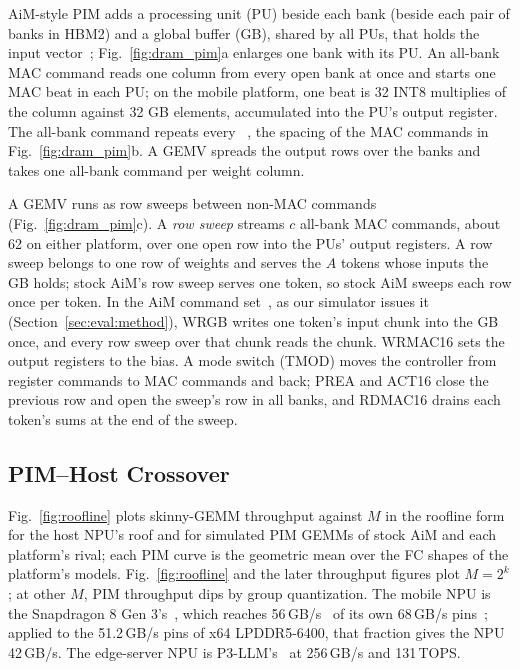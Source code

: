 AiM-style PIM adds a processing unit (PU) beside each bank (beside each pair of banks in HBM2) and a global buffer (GB),
shared by all PUs, that holds the input vector~\cite{aimjssc,hbmpim}; Fig.~\ref{fig:dram_pim}a enlarges one bank with its PU. An all-bank
MAC command reads one column from every open bank at once and starts one MAC beat in each PU; on the mobile platform,
one beat is 32 INT8 multiplies of the column against 32 GB elements, accumulated into the PU's output register. The
all-bank command repeats every \tccdl~\cite{hbmpim}, the spacing of the MAC commands in Fig.~\ref{fig:dram_pim}b. A GEMV spreads the output rows over the banks and takes one
all-bank command per weight column.

A GEMV runs as row sweeps between non-MAC commands (Fig.~\ref{fig:dram_pim}c). A \emph{row sweep} streams $c$
all-bank MAC commands, about 62 on either platform, over one open row into the PUs' output registers. A row sweep
belongs to one row of weights and serves the $A$ tokens whose inputs the GB holds; stock AiM's row sweep serves one
token, so stock AiM sweeps each row once per token. In the AiM command set~\cite{aimjssc}, as our simulator issues it
(Section~\ref{sec:eval:method}), WRGB writes one token's input chunk into the GB once, and every row sweep over that
chunk reads the chunk. WRMAC16 sets the output registers to the bias. A mode switch (TMOD) moves the controller from
register commands to MAC commands and back; PREA and ACT16 close the previous row and open the sweep's row in all
banks, and RDMAC16 drains each token's sums at the end of the sweep.

\subsection{PIM--Host Crossover}
\label{sec:bg:roofline}

Fig.~\ref{fig:roofline} plots skinny-GEMM throughput against $M$ in the roofline form~\cite{roofline} for the host
NPU's roof and for simulated PIM GEMMs of stock AiM and each platform's rival; each PIM curve is the geometric mean over
the FC shapes of the platform's models. Fig.~\ref{fig:roofline} and the later throughput figures plot $M = 2^k$; at
other $M$, PIM throughput dips by group quantization. The mobile NPU is the Snapdragon 8 Gen 3's~\cite{sd8g3}, which reaches
56\,GB/s~\cite{powerinfer2} of its own 68\,GB/s pins~\cite{heterollm}; applied to the 51.2\,GB/s pins of x64
LPDDR5-6400, that fraction gives the NPU 42\,GB/s\ASSUMPTION. The edge-server NPU is P3-LLM's~\cite{p3llm} at
256\,GB/s and 131\,TOPS\ASSUMPTION.

